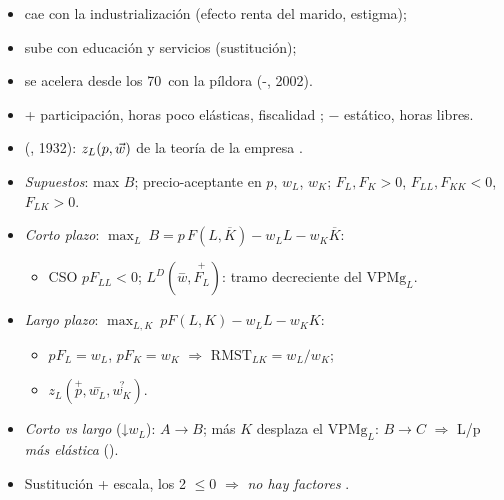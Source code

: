 \documentclass{article}
\begin{document}
\begin{columnas}
\begin{itemize}
  \begin{itemize}
  \item cae con la industrialización (efecto renta del marido, estigma);
  \item sube con educación y servicios (sustitución);
  \item se acelera desde los 70~con la píldora (-, 2002).
  \end{itemize}
\end{itemize}
\begin{itemize}
\item + participación, horas poco elásticas, fiscalidad ; $-$ estático, horas libres.
\end{itemize}

\begin{itemize}
\item {} (, 1932): $z_L(p,\vec{w})$ de la teoría de la empresa .
\end{itemize}
\begin{itemize}
\item \emph{Supuestos}: max $B$; precio-aceptante en $p$, $w_L$, $w_K$; $F_L,F_K>0$, $F_{LL},F_{KK}<0$, $F_{LK}>0$.
\item \emph{Corto plazo}: $\max_L\ B=p\,F(L,\overline{K})-w_LL-w_K\overline{K}$:
  \begin{itemize}
  \item CSO $pF_{LL}<0$; $L^D(\overset{-}{w},\overset{+}{F_L})$: tramo decreciente del $\mathrm{VPMg}_L$.
  \end{itemize}
\item \emph{Largo plazo}: $\max_{L,K}\ pF(L,K)-w_LL-w_KK$:
  \begin{itemize}
  \item $pF_L=w_L$, $pF_K=w_K$ $\Rightarrow$ $\mathrm{RMST}_{LK}=w_L/w_K$;
  \item {} $z_L(\overset{+}{p},\overset{-}{w_L},\overset{?}{w_K})$.
  \end{itemize}
\item \emph{Corto vs largo} (↓$w_L$): $A\to B$; más $K$ desplaza el $\mathrm{VPMg}_L$: $B\to C$ $\Rightarrow$ L/p \emph{más elástica} ().
\item Sustitución + escala, los 2 $\leq0$ $\Rightarrow$ \emph{no hay factores }.

\end{itemize}
\end{columnas}
\end{document}
